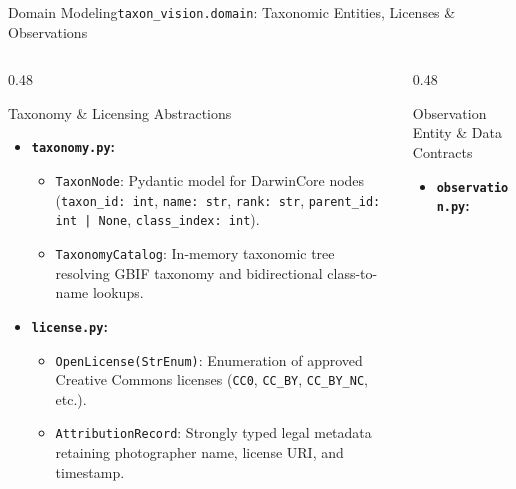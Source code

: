 \begin{frame}{Domain Modeling}{\texttt{taxon\_vision.domain}: Taxonomic Entities, Licenses \& Observations}
    \begin{columns}[T]
        \begin{column}{0.48\textwidth}
            \begin{block}{Taxonomy \& Licensing Abstractions}
                \begin{itemize}\scriptsize
                    \item \textbf{\texttt{taxonomy.py}:}
                        \begin{itemize}\tiny
                            \item \texttt{TaxonNode}: Pydantic model for DarwinCore nodes (\texttt{taxon\_id: int}, \texttt{name: str}, \texttt{rank: str}, \texttt{parent\_id: int | None}, \texttt{class\_index: int}).
                            \item \texttt{TaxonomyCatalog}: In-memory taxonomic tree resolving GBIF taxonomy and bidirectional class-to-name lookups.
                        \end{itemize}
                    \item \textbf{\texttt{license.py}:}
                        \begin{itemize}\tiny
                            \item \texttt{OpenLicense(StrEnum)}: Enumeration of approved Creative Commons licenses (\texttt{CC0}, \texttt{CC\_BY}, \texttt{CC\_BY\_NC}, etc.).
                            \item \texttt{AttributionRecord}: Strongly typed legal metadata retaining photographer name, license URI, and timestamp.
                        \end{itemize}
                \end{itemize}
            \end{block}
        \end{column}
        \begin{column}{0.48\textwidth}
            \begin{block}{Observation Entity \& Data Contracts}
                \begin{itemize}\scriptsize
                    \item \textbf{\texttt{observation.py}:}
                        \begin{itemize}\tiny

\end{itemize}
\end{itemize}
\end{block}
\end{column}
\end{columns}
\end{frame}

